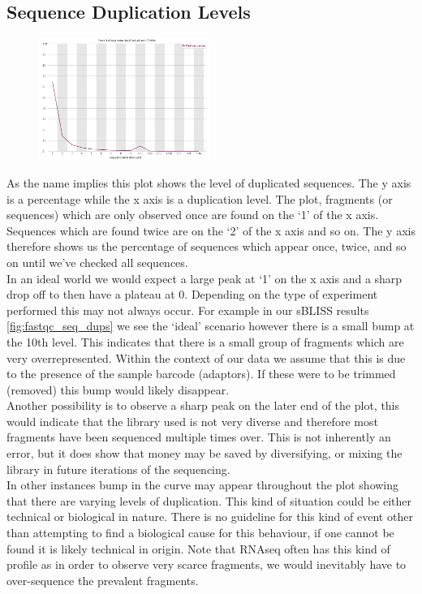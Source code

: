 \subsection{Sequence Duplication Levels \label{subsec:fastqc_seq_dup}}
\begin{figure}
  \begin{center}
    \includegraphics[width=0.5\textwidth]{figures/FastQC_seq_dups.png}
  \end{center}
  \label{fig:fastqc_seq_dups}
\end{figure}
As the name implies this plot shows the level of duplicated sequences. The y axis is a percentage while the x axis is a duplication level. The plot, fragments (or sequences) which are only observed once are found on the `1' of the x axis. Sequences which are found twice are on the `2' of the x axis and so on. The y axis therefore shows us the percentage of sequences which appear once, twice, and so on until we've checked all sequences.\\
In an ideal world we would expect a large peak at `1' on the x axis and a sharp drop off to then have a plateau at 0. Depending on the type of experiment performed this may not always occur. For example in our sBLISS results \autoref{fig:fastqc_seq_dups} we see the `ideal' scenario however there is a small bump at the 10th level. This indicates that there is a small group of fragments which are very overrepresented. Within the context of our data we assume that this is due to the presence of the sample barcode (adaptors). If these were to be trimmed (removed) this bump would likely disappear.\\
Another possibility is to observe a sharp peak on the later end of the plot, this would indicate that the library used is not very diverse and therefore most fragments have been sequenced multiple times over. This is not inherently an error, but it does show that money may be saved by diversifying, or mixing the library in future iterations of the sequencing.\\
In other instances bump in the curve may appear throughout the plot showing that there are varying levels of duplication. This kind of situation could be either technical or biological in nature. There is no guideline for this kind of event other than attempting to find a biological cause for this behaviour, if one cannot be found it is likely technical in origin. Note that RNAseq often has this kind of profile as in order to observe very scarce fragments, we would inevitably have to over-sequence the prevalent fragments.\\
